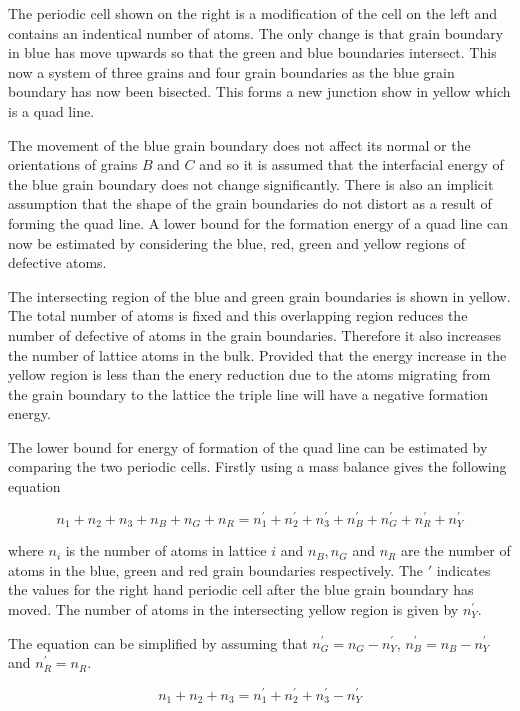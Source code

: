 \documentclass[12pt,a4paper]{book}
\begin{document}
The periodic cell shown on the right is a modification of the cell on the left and contains an indentical number of atoms. The only change is that grain boundary in blue has move upwards so that the green and blue boundaries intersect. This now a system of three grains and four grain boundaries as the blue grain boundary has now been bisected. This forms a new junction show in yellow which is a quad line.

The movement of the blue grain boundary does not affect its normal  or the orientations of grains $B$ and $C$ and so it is assumed that the interfacial energy of the blue grain boundary does not change significantly. There is also an implicit assumption that the shape of the grain boundaries do not distort as a result of forming the quad line. A lower bound for the formation energy of a quad line can now be estimated by considering the blue, red, green and yellow regions of defective atoms.

The intersecting region of the blue and green grain boundaries is shown in yellow. The total number of atoms is fixed and this overlapping region reduces the number of defective of atoms in the grain boundaries. Therefore it also increases the number of lattice atoms in the bulk. Provided that the energy increase in the yellow region is less than the enery reduction due to the atoms migrating from the grain boundary to the lattice the triple line will have a negative formation energy. 
 
The lower bound for energy of formation of the quad line can be estimated by comparing the two periodic cells. Firstly using a mass balance gives the following
equation

\[ n_1 + n_2 + n_3 + n_B + n_G + n_R = n_1^{\prime} + n_2^{\prime} + n_3^{\prime} + n_B^{\prime} + n_G^{\prime} + n_R^{\prime} +
n_Y^{\prime} \]

where $n_i$ is the number of atoms in lattice $i$ and $n_B, n_G$ and $n_R$ are the number of atoms in the blue, green and red grain boundaries respectively. The $\prime$ indicates the values for the right hand periodic cell after the blue grain boundary has moved.  The number of atoms in the intersecting yellow region is given by $n_Y^{\prime}$.

The equation can be simplified by assuming that $n_G^{\prime} = n_G-n_Y^{\prime}$, $n_B^{\prime} = n_B-n_Y^{\prime}$ and $n_R^{\prime} = n_R$. 

\[ n_1 + n_2 + n_3   = n_1^{\prime} + n_2^{\prime} + n_3^{\prime}- n_Y^{\prime} \]
\end{document}

